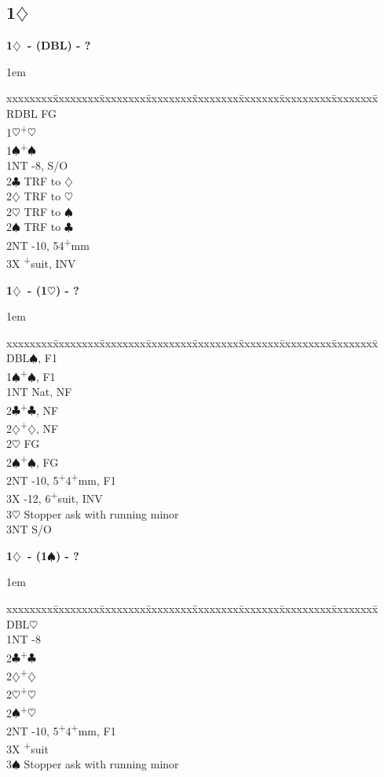 \documentclass[10pt]{article}
\renewcommand{\c}{$\clubsuit$}
\renewcommand{\d}{$\diamondsuit$}
\newcommand{\h}{$\heartsuit$}
\newcommand{\s}{$\spadesuit$}
\newcommand{\p}{\textsuperscript{+}}
\newcommand{\x}{DBL}
\newcommand{\xx}{RDBL}
\newenvironment{bidtable}[1][]
{\textbf{#1}
  \begin{adjustwidth}{1em}{}
    \addvspace{2pt}
    \begin{tabbing}
      xxxxxxxx\=xxxxxxxx\=xxxxxxxx\=xxxxxxxx\=xxxxxxxx\=xxxxxxx\=xxxxxxxxx\=xxxxxxxx\=\kill}
{\end{tabbing}\end{adjustwidth}\bigskip}%
\newcommand{\pdfd}{\texorpdfstring{\d{}}{D}}
\begin{document}
\subsection{1\pdfd}

\begin{bidtable}[1\d\ - (\x) - ?]
\xx \> FG            \\
1\h {}\p\h         \\
1\s {}\p\s         \\
1NT -8, S/O      \\
2\c \> TRF to \d     \\
2\d \> TRF to \h     \\
2\h \> TRF to \s     \\
2\s \> TRF to \c     \\
2NT -10, 54\p mm \\
3X  \p suit, INV
\end{bidtable}

\begin{bidtable}[1\d\ - (1\h) - ?]
\x  {}\s, F1                        \\
1\s {}\p\s, F1                      \\
1NT \> Nat, NF                        \\
2\c {}\p\c, NF                      \\
2\d {}\p\d, NF                      \\
2\h \> FG                             \\
2\s {}\p\s, FG                      \\
2NT -10, 5\p4\p mm, F1                \\
3X  -12, 6\p suit, INV            \\
3\h \> Stopper ask with running minor \\
3NT \> S/O                            \\
\end{bidtable}

\begin{bidtable}[1\d\ - (1\s) - ?]
\x  {}\h                            \\
1NT -8                            \\
2\c {}\p\c                          \\
2\d {}\p\d                          \\
2\h {}\p\h                          \\
2\s {}\p\h                          \\
2NT -10, 5\p4\p mm, F1            \\
3X  \p suit                       \\
3\s \> Stopper ask with running minor \\
\end{bidtable}
\end{document}
